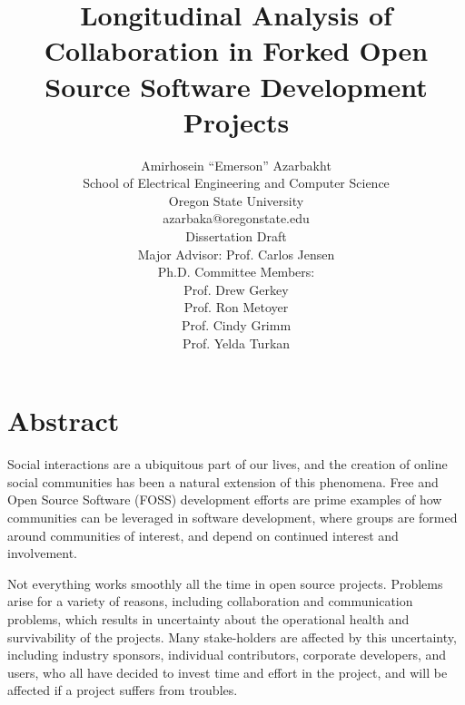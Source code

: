\documentclass[12pt]{report}
\begin{document}
\title{Longitudinal Analysis of Collaboration in Forked Open Source Software Development Projects}

\author{Amirhosein ``Emerson'' Azarbakht\\
School of Electrical Engineering and Computer Science\\
Oregon State University\\
\vspace{5mm} %
azarbaka@oregonstate.edu\\
\vspace{5mm} %
Dissertation Draft\\
Major Advisor: Prof. Carlos Jensen\\
Ph.D. Committee Members:\\
Prof. Drew Gerkey\\
Prof. Ron Metoyer\\
Prof. Cindy Grimm\\
Prof. Yelda Turkan\\
}

\maketitle

\doublespacing

\tableofcontents

\thispagestyle{empty}

\listoffigures

\listoftables

\pagebreak

\section{Abstract}

\doublespacing

Social interactions are a ubiquitous part of our lives, and the creation of online social communities has been a natural extension of this phenomena. Free and Open Source Software (FOSS) development efforts are prime examples of how communities can be leveraged in software development, where groups are formed around communities of interest, and depend on continued interest and involvement.

Not everything works smoothly all the time in open source projects. Problems arise for a variety of reasons, including collaboration and communication problems, which results in uncertainty about the operational health and survivability of the projects. Many stake-holders are affected by this uncertainty, including industry sponsors, individual contributors, corporate developers, and users, who all have decided to invest time and effort in the project, and will be affected if a project suffers from troubles.
\end{document}
